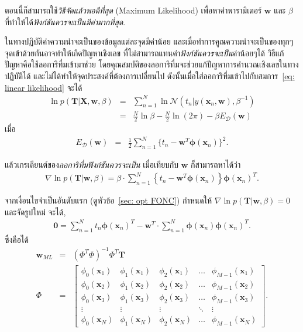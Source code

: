 ตอนนี้ก็สามารถใช้\textit{วิธีจัดแล้วพอดีที่สุด} (Maximum Likelihood) เพื่อหาค่าพารามิเตอร์ $\mathbf{w}$ และ $\beta$ ที่ทำให้ได้\textit{ฟังก์ชันควรจะเป็นมีค่ามากที่สุด}.

ในทางปฏิบัติค่าความน่าจะเป็นของข้อมูลแต่ละจุดมีค่าน้อย
และเมื่อทำการคูณความน่าจะเป็นของทุกๆจุดเข้าด้วยกันอาจทำให้เกิดปัญหาเชิงเลข
ที่ไม่สามารถแทนค่า\textit{ฟังก์ชันควรจะเป็น}ค่าน้อยๆได้
วิธีแก้ปัญหาคือใช้ลอการิทึ่มเข้ามาช่วย โดยคุณสมบัติของลอการิทึ่มจะช่วยแก้ปัญหาการคำนวณเชิงเลขในทางปฏิบัติได้
และไม่ได้ทำให้จุดประสงค์ที่ต้องการเปลี่ยนไป
ดังนั้นเมื่อใส่ลอการิทึ่มเข้าไปกับสมการ~\ref{eq: linear likelihood} จะได้
\begin{eqnarray}
   \ln p(\mathbf{T} | \mathbf{X}, \mathbf{w}, \beta)
   &=& \sum_{n=1}^N \ln \mathcal{N}( t_n | y(\mathbf{x}_n , \mathbf{w}), \beta^{-1})
\nonumber \\
   &=& \frac{N}{2} \ln \beta - \frac{N}{2} \ln (2 \pi) - \beta E_{\mathcal{D}}(\mathbf{w})
\label{eq: linear log likelihood}   
\end{eqnarray}
เมื่อ
\begin{eqnarray}
   E_{\mathcal{D}}(\mathbf{w}) &=& \frac{1}{2} \sum_{n=1}^N \{ t_n - \mathbf{w}^T \bm{\phi}(\mathbf{x}_n) \}^2.
\label{eq: linear Error}
\end{eqnarray}

แล้วเกรเดียนต์ของ\textit{ลอการิทึ่มฟังก์ชันควรจะเป็น} เมื่อเทียบกับ $\mathbf{w}$ ก็สามารถหาได้ว่า
\begin{eqnarray}
   \nabla \ln p(\mathbf{T} | \mathbf{w}, \beta) 
   = \beta \cdot \sum_{n=1}^N \left\{ t_n - \mathbf{w}^T \bm{\phi} (\mathbf{x}_n) \right\} \bm{\phi}(\mathbf{x}_n)^T.
\label{eq: linear gradient log likelihood}
\end{eqnarray}

จากเงื่อนไขจำเป็นอันดับแรก (ดูหัวข้อ~\ref{sec: opt FONC}) 
กำหนดให้ $\nabla \ln p(\mathbf{T} | \mathbf{w}, \beta) = 0$ และจัดรูปใหม่ จะได้,
\begin{eqnarray}
   \mathbf{0} = \sum_{n=1}^N t_n \bm{\phi}(\mathbf{x}_n)^T - \mathbf{w}^T \cdot \sum_{n=1}^N  \bm{\phi} (\mathbf{x}_n)  \bm{\phi}(\mathbf{x}_n)^T.
\label{eq: linear gradient log likelihood 0}
\end{eqnarray}
ซึ่งคือได้
\begin{eqnarray}
   \mathbf{w}_{ML} &=& (\Phi^T \Phi)^{-1} \Phi^T \mathbf{T}
\label{eq: linear W} \\
   \Phi &=& \begin{bmatrix}
   \phi_0(\mathbf{x}_1) & \phi_1(\mathbf{x}_1) & \phi_2(\mathbf{x}_1) & \ldots & \phi_{M-1}(\mathbf{x}_1) \\
   \phi_0(\mathbf{x}_2) & \phi_1(\mathbf{x}_2) & \phi_2(\mathbf{x}_2) & \ldots & \phi_{M-1}(\mathbf{x}_2) \\
   \phi_0(\mathbf{x}_3) & \phi_1(\mathbf{x}_3) & \phi_2(\mathbf{x}_3) & \ldots & \phi_{M-1}(\mathbf{x}_3) \\
   \vdots & \vdots & \vdots & \ddots & \vdots \\
   \phi_0(\mathbf{x}_N) & \phi_1(\mathbf{x}_N) & \phi_2(\mathbf{x}_N) & \ldots & \phi_{M-1}(\mathbf{x}_N)   
   \end{bmatrix}.
\label{eq: linear Moore-Penrose pseudo-inverse}
\end{eqnarray}

